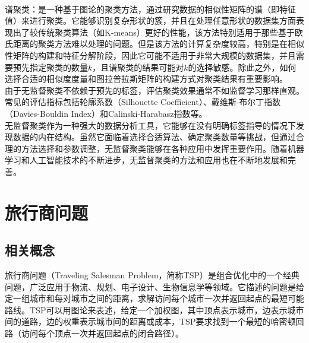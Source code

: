 \documentclass{NauThesis}
\begin{document}
\\\hspace*{2em}谱聚类：是一种基于图论的聚类方法，通过研究数据的相似性矩阵的谱（即特征值）来进行聚类。它能够识别复杂形状的簇，并且在处理任意形状的数据集方面表现出了较传统聚类算法（如K-means）更好的性能，该方法特别适用于那些基于欧氏距离的聚类方法难以处理的问题。但是该方法的计算复杂度较高，特别是在相似性矩阵的构建和特征分解阶段，因此它可能不适用于非常大规模的数据集，并且需要预先指定聚类的数量$k$，且谱聚类的结果可能对$k$的选择敏感。除此之外，如何选择合适的相似度度量和图拉普拉斯矩阵的构建方式对聚类结果有重要影响。
\\\hspace*{2em}由于无监督聚类不依赖于预先的标签，评估聚类效果通常不如监督学习那样直观。常见的评估指标包括轮廓系数（Silhouette Coefficient）、戴维斯-布尔丁指数（Davies-Bouldin Index）和Calinski-Harabasz指数等。
\\\hspace*{2em}无监督聚类作为一种强大的数据分析工具，它能够在没有明确标签指导的情况下发现数据的内在结构。虽然它面临着选择合适算法、确定聚类数量等挑战，但通过合理的方法选择和参数调整，无监督聚类能够在各种应用中发挥重要作用。随着机器学习和人工智能技术的不断进步，无监督聚类的方法和应用也在不断地发展和完善。

\section{旅行商问题}
\subsection{相关概念}
旅行商问题（Traveling Salesman Problem，简称TSP）是组合优化中的一个经典问题，广泛应用于物流、规划、电子设计、生物信息学等领域。它描述的问题是给定一组城市和每对城市之间的距离，求解访问每个城市一次并返回起点的最短可能路线。TSP可以用图论来表述，给定一个加权图，其中顶点表示城市，边表示城市间的道路，边的权重表示城市间的距离或成本，TSP要求找到一个最短的哈密顿回路（访问每个顶点一次并返回起点的闭合路径）。
\end{document}
